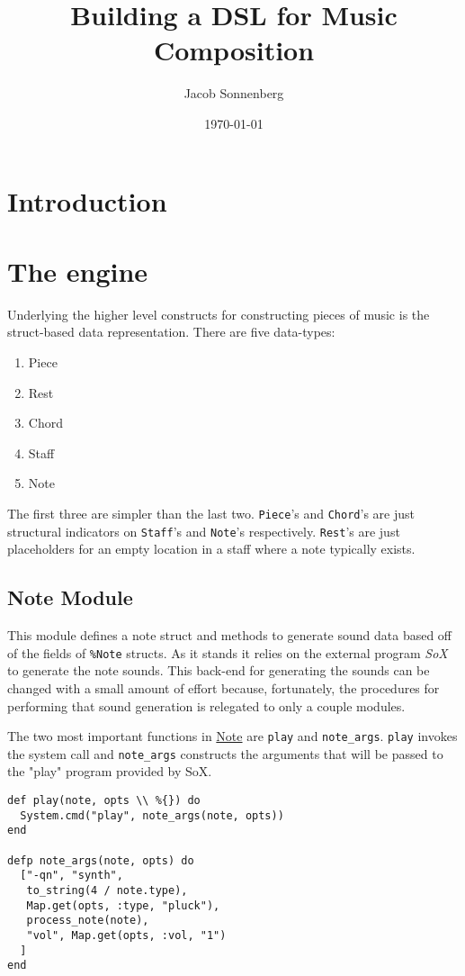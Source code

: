 \documentclass[11pt]{article}
\author{Jacob Sonnenberg}
\date{\today}
\title{Building a DSL for Music Composition}
\begin{document}
\maketitle
\tableofcontents

\section{Introduction}
\label{sec-1}

\section{The engine}
\label{sec-2}
Underlying the higher level constructs for constructing pieces of
music is the struct-based data representation. There are five
data-types:
\begin{enumerate}
\item Piece
\item Rest
\item Chord
\item Staff
\item Note
\end{enumerate}
The first three are simpler than the last two. \verb~Piece~'s and
\verb~Chord~'s are just structural indicators on \verb~Staff~'s and \verb~Note~'s
respectively. \verb~Rest~'s are just placeholders for an empty location
in a staff where a note typically exists.

\subsection{Note Module}
\label{sec-2-1}
This module defines a note struct and methods to generate sound
data based off of the fields of \verb~%Note~ structs. As it stands it
relies on the external program \emph{SoX} to generate the note
sounds. This back-end for generating the sounds can be changed with
a small amount of effort because, fortunately, the procedures for
performing that sound generation is relegated to only a couple
modules.

The two most important functions in \href{lib/harpsi.ex}{Note} are \texttt{play} and
\texttt{note\_args}. \texttt{play} invokes the system call and \texttt{note\_args}
constructs the arguments that will be passed to the "play" program
provided by SoX.
\begin{verbatim}
def play(note, opts \\ %{}) do
  System.cmd("play", note_args(note, opts))
end

defp note_args(note, opts) do
  ["-qn", "synth",
   to_string(4 / note.type),
   Map.get(opts, :type, "pluck"),
   process_note(note),
   "vol", Map.get(opts, :vol, "1")
  ]
end
\end{verbatim}
\end{document}
